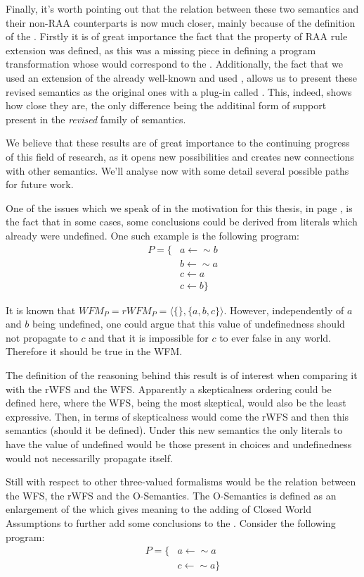Finally, it's worth pointing out that the relation between these two semantics and their non-RAA counterparts is now much closer, mainly because of the definition of the \gro. Firstly it is of great importance the fact that the property of RAA rule extension was defined, as this was a missing piece in defining a program transformation whose \sms would correspond to the \rsms. Additionally, the fact that we used an extension of the already well-known and used \go, allows us to present these revised semantics as the original ones with a plug-in called \raa. This, indeed, shows how close they are, the only difference being the additinal form of support present in the \emph{revised} family of semantics.

We believe that these results are of great importance to the continuing progress of this field of research, as it opens new possibilities and creates new connections with other semantics. We'll analyse now with some detail several possible paths for future work. 

One of the issues which we speak of in the motivation for this thesis, in page \pageref{sec:motiv}, is the fact that in some cases, some conclusions could be derived from literals which already were undefined. One such example is the following program:
\begin{align*}
P=\{
& a\leftarrow\sim b\\
& b\leftarrow\sim a\\
& c\leftarrow a\\
& c\leftarrow b
\}
\end{align*}

It is known that $WFM_{P} = rWFM_{P} = \langle\{\},\{a,b,c\}\rangle$. However, independently of $a$ and $b$ being undefined, one could argue that this value of undefinedness should not propagate to $c$ and that it is impossible for $c$ to ever false in any world. Therefore it should be true in the WFM. 

The definition of the reasoning behind this result is of interest when comparing it with the rWFS and the WFS. Apparently a skepticalness ordering could be defined here, where the WFS, being the most skeptical, would also be the least expressive. Then, in terms of skepticalness would come the rWFS and then this semantics (should it be defined). Under this new semantics the only literals to have the value of undefined would be those present in choices and undefinedness would not necessarilly propagate itself.

Still with respect to other three-valued formalisms would be the relation between the WFS, the rWFS and the O-Semantics\cite{oSemantics}. The O-Semantics is defined as an enlargement of the \wfs which gives meaning to
the adding of Closed World Assumptions to further add some conclusions to the \wfs. Consider the following program:
\begin{align*}
P=\{
& a\leftarrow\sim a\\
& c\leftarrow\sim a
\}
\end{align*}

